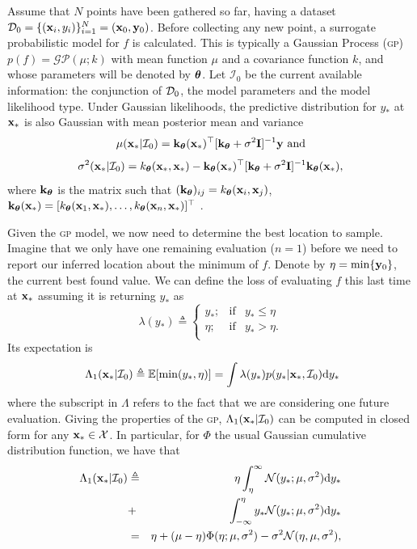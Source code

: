 \documentclass[twoside]{article}
\newcommand{\I}{\mathcal{I}}
\newcommand{\ud}{\mathrm{d}}
\newcommand{\E}{\mathbb{E}}
\newcommand{\acr}[1]{\textsc{#1}\xspace}
\newcommand{\gp}{\acr{gp}}
\begin{document}
Assume that $N$ points have been gathered so far, having a dataset $\mathcal{D}_0 = \{(\mathbf{x}_i,y_i)\}_{i=1}^N = (\mathbf{\relax{x}}_0,\mathbf{y}_0)$. Before collecting any new point, a surrogate probabilistic model for $f$ is calculated. This is typically a Gaussian Process (\gp) $p(f) = \mathcal{GP}(\mu; k)$ with mean function $\mu$ and a covariance function $k$, and whose parameters will be denoted by $\boldsymbol{\theta}$.  Let $\I_0$ be the current available information: the conjunction of $\mathcal{D}_0$, the model parameters and the model likelihood type.  Under Gaussian likelihoods, the predictive distribution for $y_*$ at $\mathbf{x}_*$ is also Gaussian with mean posterior mean and variance
$$\mu(\latentVector_{*}|\I_0) = \kernelVector_{\parameterVector}(\latentMatrix_*)^\top[\kernelVector_{\parameterVector} + \sigma^2 \textbf{I}]^{-1}\dataVector \mbox{ and}$$
$$\sigma^2(\latentVector_*|\I_0)=k_{\parameterVector}(\latentVector_*,\latentVector_*)-\kernelVector_{\parameterVector}(\latentVector_*)^\top[\kernelMatrix_{\parameterVector}+\sigma^2 \textbf{I}]^{-1}\kernelVector_{\parameterVector}(\latentVector_*),$$
where $\mathbf{\relax{k}}_{\boldsymbol{\theta}}$ is the matrix such that $(\mathbf{\relax{k}}_{\boldsymbol{\theta}})_{ij}=k_{\boldsymbol{\theta}}(\mathbf{x}_i,\mathbf{x}_j)$,  $\mathbf{k}_{\boldsymbol{\theta}}(\mathbf{x}_{*}) = [k_{\boldsymbol{\theta}}(\mathbf{x}_1,\mathbf{x}_{*}),\dots,k_{\boldsymbol{\theta}}(\mathbf{x}_n,\mathbf{x}_{*})]^\top$ \citep{Rasmussen:2005:GPM:1162254}.  


Given the \gp model, we now need to determine the best location to sample. Imagine that we only have one remaining evaluation ($n=1$) before we need to report our inferred location about the minimum of $f$. Denote by $\eta = \min \{\mathbf{y}_0\}$, the current best found value. We can define the loss of evaluating $f$ this last time at $\mathbf{x}_*$ assuming it is returning $y_*$ as
$$\lambda(y_*)\triangleq \left\{ \begin{array}{lcl}
y_*;             & \mbox{if}  &  y_* \leq \eta \\
 \eta; & \mbox{if}  & y_* > \eta. \\
\end{array}
\right.$$
Its expectation is 
$$\ \Lambda_1(\latentVector_*| \I_0) \triangleq \E[ \min (y_*,\eta)]= \int \lambda(y_*)p(y_* |\latentVector_*,\I_0)\ud y_*$$
where the subscript in $\Lambda$ refers to the fact that we are considering one future evaluation.  Giving the properties of the \gp, $\Lambda_1(\latentVector_*| \I_0)$ can be computed in closed form for any $\mathbf{x}_* \in \mathcal{X}$. In particular, for $\Phi$ the usual Gaussian cumulative distribution function, we have that
\begin{eqnarray}\label{eq:expected_myopic_loss}
\Lambda_1(\latentVector_*| \I_0) &  \triangleq & \eta \int_{\eta}^{\infty} \mathcal{N}(y_*;\mu,\sigma^2) \ud y_* \\ \nonumber
& +  & \int_{-\infty}^{\eta} y_* \mathcal{N}(y_*;\mu,\sigma^2) \ud y_*  \\ \nonumber
& = &  \eta +(\mu  - \eta) \Phi (\eta ; \mu, \sigma^2) - \sigma^2 \mathcal{N} (\eta, \mu, \sigma^2), \nonumber
\end{eqnarray}
\end{document}
